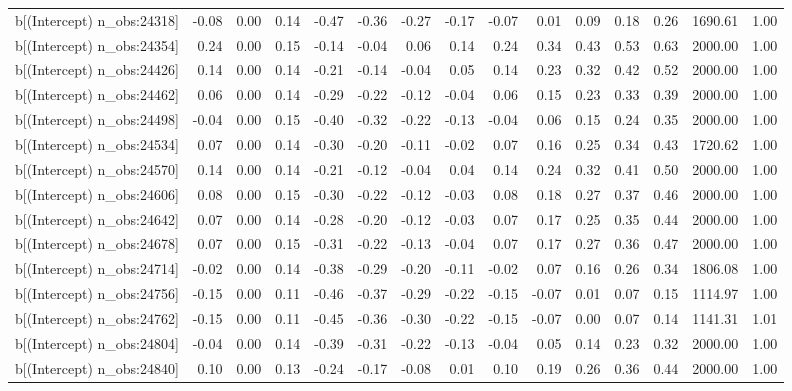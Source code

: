 \begin{table}[ht]
\begin{tabular}{rrrrrrrrrrrrrrr}
  b[(Intercept) n\_obs:24318] & -0.08 & 0.00 & 0.14 & -0.47 & -0.36 & -0.27 & -0.17 & -0.07 & 0.01 & 0.09 & 0.18 & 0.26 & 1690.61 & 1.00 \\ 
  b[(Intercept) n\_obs:24354] & 0.24 & 0.00 & 0.15 & -0.14 & -0.04 & 0.06 & 0.14 & 0.24 & 0.34 & 0.43 & 0.53 & 0.63 & 2000.00 & 1.00 \\ 
  b[(Intercept) n\_obs:24426] & 0.14 & 0.00 & 0.14 & -0.21 & -0.14 & -0.04 & 0.05 & 0.14 & 0.23 & 0.32 & 0.42 & 0.52 & 2000.00 & 1.00 \\ 
  b[(Intercept) n\_obs:24462] & 0.06 & 0.00 & 0.14 & -0.29 & -0.22 & -0.12 & -0.04 & 0.06 & 0.15 & 0.23 & 0.33 & 0.39 & 2000.00 & 1.00 \\ 
  b[(Intercept) n\_obs:24498] & -0.04 & 0.00 & 0.15 & -0.40 & -0.32 & -0.22 & -0.13 & -0.04 & 0.06 & 0.15 & 0.24 & 0.35 & 2000.00 & 1.00 \\ 
  b[(Intercept) n\_obs:24534] & 0.07 & 0.00 & 0.14 & -0.30 & -0.20 & -0.11 & -0.02 & 0.07 & 0.16 & 0.25 & 0.34 & 0.43 & 1720.62 & 1.00 \\ 
  b[(Intercept) n\_obs:24570] & 0.14 & 0.00 & 0.14 & -0.21 & -0.12 & -0.04 & 0.04 & 0.14 & 0.24 & 0.32 & 0.41 & 0.50 & 2000.00 & 1.00 \\ 
  b[(Intercept) n\_obs:24606] & 0.08 & 0.00 & 0.15 & -0.30 & -0.22 & -0.12 & -0.03 & 0.08 & 0.18 & 0.27 & 0.37 & 0.46 & 2000.00 & 1.00 \\ 
  b[(Intercept) n\_obs:24642] & 0.07 & 0.00 & 0.14 & -0.28 & -0.20 & -0.12 & -0.03 & 0.07 & 0.17 & 0.25 & 0.35 & 0.44 & 2000.00 & 1.00 \\ 
  b[(Intercept) n\_obs:24678] & 0.07 & 0.00 & 0.15 & -0.31 & -0.22 & -0.13 & -0.04 & 0.07 & 0.17 & 0.27 & 0.36 & 0.47 & 2000.00 & 1.00 \\ 
  b[(Intercept) n\_obs:24714] & -0.02 & 0.00 & 0.14 & -0.38 & -0.29 & -0.20 & -0.11 & -0.02 & 0.07 & 0.16 & 0.26 & 0.34 & 1806.08 & 1.00 \\ 
  b[(Intercept) n\_obs:24756] & -0.15 & 0.00 & 0.11 & -0.46 & -0.37 & -0.29 & -0.22 & -0.15 & -0.07 & 0.01 & 0.07 & 0.15 & 1114.97 & 1.00 \\ 
  b[(Intercept) n\_obs:24762] & -0.15 & 0.00 & 0.11 & -0.45 & -0.36 & -0.30 & -0.22 & -0.15 & -0.07 & 0.00 & 0.07 & 0.14 & 1141.31 & 1.01 \\ 
  b[(Intercept) n\_obs:24804] & -0.04 & 0.00 & 0.14 & -0.39 & -0.31 & -0.22 & -0.13 & -0.04 & 0.05 & 0.14 & 0.23 & 0.32 & 2000.00 & 1.00 \\ 
  b[(Intercept) n\_obs:24840] & 0.10 & 0.00 & 0.13 & -0.24 & -0.17 & -0.08 & 0.01 & 0.10 & 0.19 & 0.26 & 0.36 & 0.44 & 2000.00 & 1.00 \\ 

\end{tabular}
\end{table}
